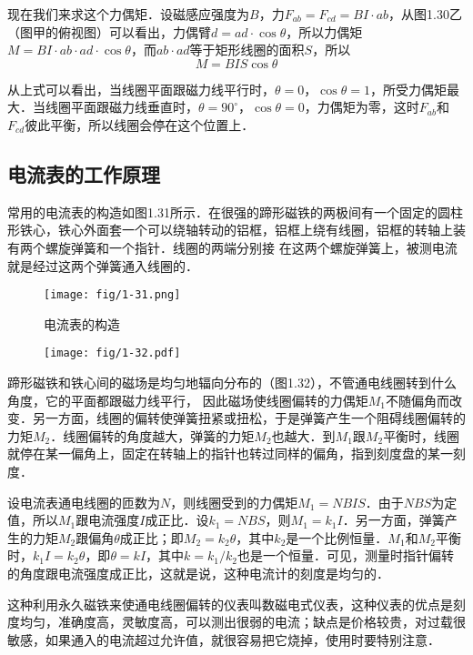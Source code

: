 现在我们来求这个力偶矩．设磁感应强度为$B$，力$F_{ab}=
F_{cd}=BI·ab$，从图1.30乙（图甲的俯视图）可以看出，力偶臂$d=ad\cdot \cos\theta$，所以力偶矩$M=BI\cdot ab\cdot ad\cdot \cos\theta$，而$ab\cdot ad$等于矩形线圈的面积$S$，所以$$M=BIS\cos\theta$$

从上式可以看出，当线圈平面跟磁力线平行时，$\theta=0$，$\cos\theta=1$，所受力偶矩最大．当线圈平面跟磁力线垂直时，$\theta=90^{\circ}$，$\cos\theta=0$，力偶矩为零，这时$F_{ab}$和$F_{cd}$彼此平衡，所以线圈会停在这个位置上．

\subsection{电流表的工作原理}

常用的电流表的构造如图1.31所示．在很强的蹄形磁铁的两极间有一个固定的圆柱形铁心，铁心外面套一个可以绕轴转动的铝框，铝框上绕有线圈，铝框的转轴上装有两个螺旋弹簧和一个指针．线圈的两端分别接
在这两个螺旋弹簧上，被测电流就是经过这两个弹簧通入线圈的．
\begin{figure}[htp]\centering
	\begin{minipage}[t]{0.48\textwidth}
		\centering
		\texttt{[image: fig/1-31.png]}
		\caption{电流表的构造}
	\end{minipage}
	\begin{minipage}[t]{0.48\textwidth}
		\centering
		\texttt{[image: fig/1-32.pdf]}
		\caption{}
	\end{minipage}
\end{figure}


蹄形磁铁和铁心间的磁场是均匀地辐向分布的（图1.32），不管通电线圈转到什么角度，它的平面都跟磁力线平行，
因此磁场使线圈偏转的力偶矩$M_1$不随偏角而改变．另一方面，线圈的偏转使弹簧扭紧或扭松，于是弹簧产生一个阻碍线圈偏转的力矩$M_2$．线圈偏转的角度越大，弹簧的力矩$M_2$也越大．到$M_1$跟$M_2$平衡时，线圈就停在某一偏角上，固定在转轴上的指针也转过同样的偏角，指到刻度盘的某一刻度．

设电流表通电线圈的匝数为$N$，则线圈受到的力偶矩$M_1=NBIS$．由于$NBS$为定值，所以$M_1$跟电流强度$I$成正比．设$k_1=NBS$，则$M_1=k_1I$．另一方面，弹簧产生的力矩$M_2$跟偏角$\theta$成正比；即$M_2=k_2\theta$，其中$k_2$是一个比例恒量．$M_1$和$M_2$平衡时，$k_1I=k_2\theta$，即$\theta =kI$，其中$k=k_1/k_2$也是一个恒量．可见，测量时指针偏转的角度跟电流强度成正比，这就是说，这种电流计的刻度是均匀的．

这种利用永久磁铁来使通电线圈偏转的仪表叫数磁电式仪表，这种仪表的优点是刻度均匀，准确度高，灵敏度高，可以测出很弱的电流；缺点是价格较贵，对过载很敏感，如果通入的电流超过允许值，就很容易把它烧掉，使用时要特别注意．

